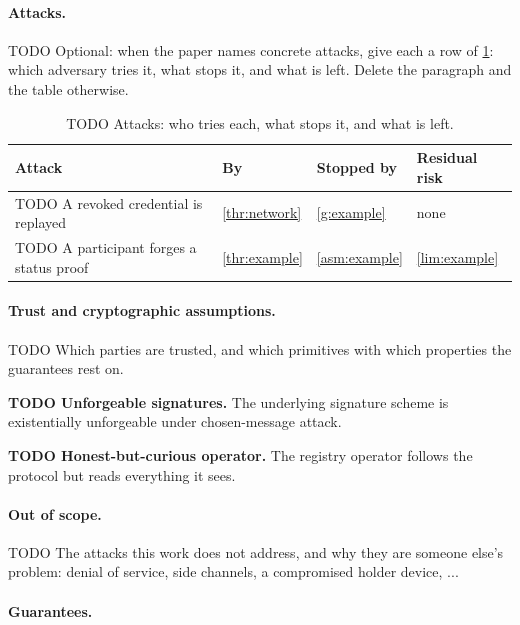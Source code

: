 \paragraph{Attacks.}
TODO Optional: when the paper names concrete attacks, give each a row of \cref{tab:attacks}: which adversary tries it, what stops it, and what is left. Delete the paragraph and the table otherwise.
\begin{table}[htbp]
  \centering
  \caption{TODO Attacks: who tries each, what stops it, and what is left.}
  \label{tab:attacks}
  {\small
  \begin{tabularx}{\linewidth}{>{\raggedright\arraybackslash}X l >{\raggedright\arraybackslash}X >{\raggedright\arraybackslash}X}
    \toprule
    \textbf{Attack} & \textbf{By} & \textbf{Stopped by} & \textbf{Residual risk} \\
    \midrule
    TODO A revoked credential is replayed & \cref{thr:network} & \cref{g:example} & none \\
    TODO A participant forges a status proof & \cref{thr:example} & \cref{asm:example} & \cref{lim:example} \\
    \bottomrule
  \end{tabularx}
  }
\end{table}

\paragraph{Trust and cryptographic assumptions.}
TODO Which parties are trusted, and which primitives with which properties the guarantees rest on.
\begin{assumptions}
  \item\label{asm:example} \textbf{TODO Unforgeable signatures.} The underlying signature scheme is existentially unforgeable under chosen-message attack.
  \item\label{asm:trust} \textbf{TODO Honest-but-curious operator.} The registry operator follows the protocol but reads everything it sees.
\end{assumptions}

\paragraph{Out of scope.}
TODO The attacks this work does not address, and why they are someone else's problem: denial of service, side channels, a compromised holder device, ...

\paragraph{Guarantees.}

